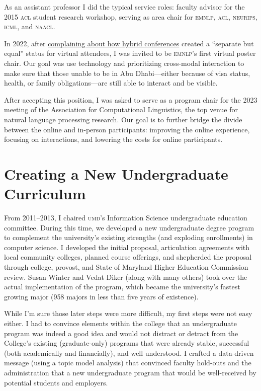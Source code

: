 \documentclass[11pt]{amsart}
\newcommand{\abr}[1]{\textsc{#1}}
\begin{document}
As an assistant professor I did the typical service roles: faculty advisor for
the 2015 \abr{acl} student research workshop, serving as area chair for
\abr{emnlp}, \abr{acl}, \abr{neurips}, \abr{icml}, and \abr{naacl}.

In 2022, after
\href{https://www.youtube.com/watch?v=3gSgNXGxzQU}{complaining about
  how hybrid conferences} created a ``separate but equal'' status for
virtual attendees, I was invited to be \abr{emnlp}'s first virtual
poster chair.
%
Our goal was use technology and prioritizing cross-modal interaction
to make sure that those unable to be in Abu Dhabi---either because of
visa status, health, or family obligations---are still able to
interact and be visible.

After accepting this position, I was asked to serve as a program chair for the
2023 meeting of the Association for Computational Linguistics, the top venue
for natural language processing research.
%
Our goal is to further bridge the divide between the online and in-person
participants: improving the online experience, focusing on interactions, and
lowering the costs for online participants.



\section{Creating a New Undergraduate Curriculum}

From 2011--2013, I chaired \abr{umd}'s Information Science
undergraduate education committee. During this time, we developed a
new undergraduate degree program to complement the university's
existing strengths (and exploding enrollments) in computer science. I
developed the initial proposal, articulation agreements with local
community colleges, planned course offerings, and shepherded the
proposal through college, provost, and State of Maryland Higher
Education Commission review.
%
Susan Winter and Vedat Diker (along with many others) took over the actual
implementation of the program, which became the university's fastest growing
major (958 majors in less than five years of existence).

While I'm sure those later steps were more difficult, my first steps
were not easy either.
%
I had to convince elements within the college that an
undergraduate program was indeed a good idea and would not distract or
detract from the College's existing (graduate-only) programs that were
already stable, successful (both academically and financially), and
well understood.
%
I crafted a data-driven message (using a topic model analysis) that
convinced faculty hold-outs and the administration that a new
undergraduate program that would be well-received by potential
students and employers.
\end{document}
